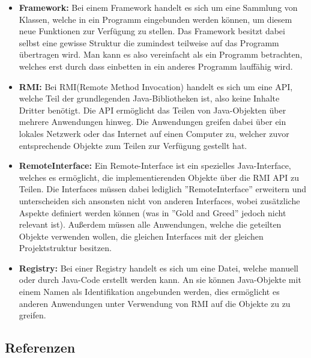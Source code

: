 \documentclass[fontsize=12pt,paper=a4,twoside]{scrartcl}
\begin{document}
\begin{itemize}
\item \textbf{Framework:} Bei einem Framework handelt es sich um eine Sammlung von Klassen, welche in ein Programm eingebunden werden können, um diesem neue Funktionen zur Verfügung zu stellen. Das Framework besitzt dabei selbst eine gewisse Struktur die zumindest teilweise auf das Programm übertragen wird. Man kann es also vereinfacht als ein Programm betrachten, welches erst durch dass einbetten in ein anderes Programm lauffähig wird.
\item \textbf{RMI:} Bei RMI(Remote Method Invocation) handelt es sich um eine API, welche Teil der grundlegenden Java-Bibliotheken ist, also keine Inhalte Dritter benötigt. Die API ermöglicht das Teilen von Java-Objekten über mehrere Anwendungen hinweg. Die Anwendungen greifen dabei über ein lokales Netzwerk oder das Internet auf einen Computer zu, welcher zuvor entsprechende Objekte zum Teilen zur Verfügung gestellt hat.
\item \textbf{RemoteInterface:} Ein Remote-Interface ist ein spezielles Java-Interface, welches es ermöglicht, die implementierenden Objekte über die RMI API zu Teilen. Die Interfaces müssen dabei lediglich ''RemoteInterface'' erweitern und unterscheiden sich ansonsten nicht von anderen Interfaces, wobei zusätzliche Aspekte definiert werden können (was in ''Gold and Greed'' jedoch nicht relevant ist). Außerdem müssen alle Anwendungen, welche die geteilten Objekte verwenden wollen, die gleichen Interfaces mit der gleichen Projektstruktur besitzen.
\item \textbf{Registry:} Bei einer Registry handelt es sich um eine Datei, welche manuell oder durch Java-Code erstellt werden kann. An sie können Java-Objekte mit einem Namen als Identifikation angebunden werden, dies ermöglicht es anderen Anwendungen unter Verwendung von RMI auf die Objekte zu zu greifen. 
\end{itemize}

\subsection{Referenzen}
\end{document}
